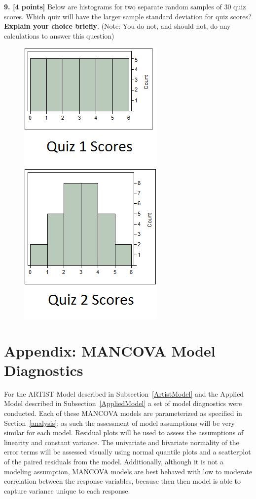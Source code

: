 \documentclass[11pt]{isuthesis}\usepackage[]{graphicx}\usepackage[]{color}
\begin{document}
\begin{appendices}

\textbf{9. [4 points]} Below are histograms for two separate random samples of 30 quiz scores.  Which quiz will have the larger sample standard deviation for quiz scores? \textbf{Explain your choice briefly}. (Note: You do not, and should not, do any calculations to answer this question)
\begin{figure}[H]
\begin{center}
\includegraphics[keepaspectratio=TRUE,width=.2\textwidth]{CurriculumStudy/QuizScores1Version1.png}
\includegraphics[keepaspectratio=TRUE,width=.2\textwidth]{CurriculumStudy/QuizScores2Version1.png}
\end{center}
\end{figure}

\section{Appendix: MANCOVA Model Diagnostics}
\label{appModDiag}

For the ARTIST Model described in Subsection~\ref{ArtistModel} and the Applied Model described in Subsection~\ref{AppliedModel} a set of model diagnostics were conducted. Each of these MANCOVA models are parameterized as specified in Section~\ref{analysis}; as such the assessment of model assumptions will be very similar for each model.   Residual plots will be used to assess the assumptions of linearity and constant variance.  The univariate and bivariate normality of the error terms will be assessed visually using normal quantile plots and a scatterplot of the paired residuals from the model. Additionally, although it is not a modeling assumption, MANCOVA models are best behaved with low to moderate correlation between the response variables, because then then model is able to capture variance unique to each response. 


\end{appendices}
\end{document}

